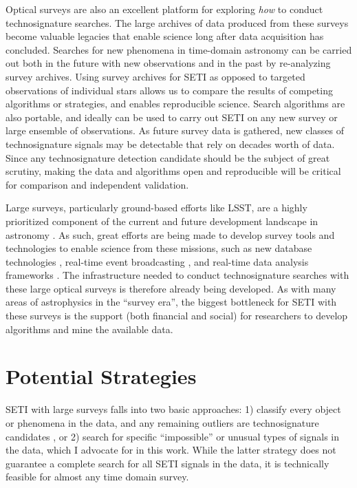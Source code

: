 \documentclass[twocolumn]{aastex62}
\begin{document}
Optical surveys are also an excellent platform for exploring {\it how} to conduct technosignature searches. The large archives of data produced from these surveys become valuable legacies that enable science long after data acquisition has concluded. Searches for new phenomena in time-domain astronomy can be carried out both in the future with new observations and in the past by re-analyzing survey archives. 
Using survey archives for SETI as opposed to targeted observations of individual stars allows us to compare the results of competing algorithms or strategies, and enables reproducible science. Search algorithms are also portable, and ideally can be used to carry out SETI on any new survey or large ensemble of observations.
As future survey data is gathered, new classes of technosignature signals may be detectable that rely on decades worth of data. 
Since any technosignature detection candidate should be the subject of great scrutiny, making the data and algorithms open and reproducible will be critical for comparison and independent validation. 


Large surveys, particularly ground-based efforts like LSST, are a highly prioritized component of the current and future development landscape in astronomy \citep{astro2010}. As such, great efforts are being made to develop survey tools and technologies to enable science from these missions, such as new database technologies \citep{juric2012,zecevic2019}, real-time event broadcasting \citep{patterson2019}, and real-time data analysis frameworks \citep[e.g.][]{schwamb2019}.
The infrastructure needed to conduct technosignature searches with these large optical surveys is therefore already being developed. As with many areas of astrophysics in the ``survey era'', the biggest bottleneck for SETI with these surveys is the support (both financial and social) for researchers to develop algorithms and mine the available data.




\section{Potential Strategies}
\label{sec:strategy}

SETI with large surveys falls into two basic approaches: 1) classify every object or phenomena in the data, and any remaining outliers are technosignature candidates \citep{djorgovski2000}, or 2) search for specific ``impossible'' or unusual types of signals in the data, which I advocate for in this work. While the latter strategy does not guarantee a complete search for all SETI signals in the data, it is technically feasible for almost any time domain survey. 
\end{document}
